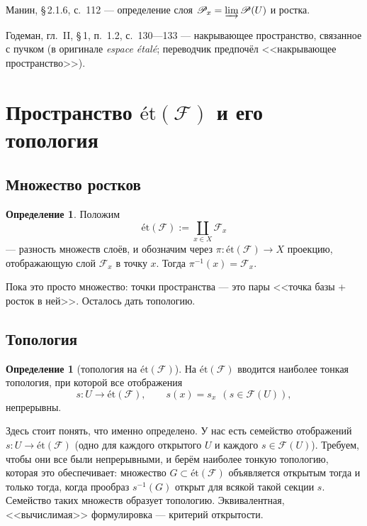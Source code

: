 \documentclass[11pt,b5paper]{article}
\newcommand{\et}{\text{ét}}
\newcommand{\Shv}[1]{\mathscr{#1}}   %
\newcommand{\dirlim}{\varinjlim}
\theoremstyle{plain}
\theoremstyle{definition}
\newtheorem{defninner}[thminner]{Определение}
\theoremstyle{remark}
\newcommand{\thmbeg}{%
  \par\smallskip
  \begin{lrbox}{\thmbox}%
  \begin{minipage}{\linewidth}}
\newcommand{\thmend}{%
  \end{minipage}%
  \end{lrbox}%
  \noindent\usebox{\thmbox}%
  \par\smallskip}
\newenvironment{defn}{\thmbeg\begin{defninner}}{\end{defninner}\thmend}
\newenvironment{bookbox}{\par\smallskip\begingroup\color{gray}\noindent
  \ignorespaces}{\par\endgroup\smallskip}
\newcommand{\booksrc}[1]{%
  \noindent{\bfseries\small Дополнение из книги:}\par\smallskip
  \noindent#1\par\smallskip}
\let\brutsection\section
\renewcommand{\section}{\Needspace{7\baselineskip}\brutsection}
\let\brutsubsection\subsection
\renewcommand{\subsection}{\Needspace{5\baselineskip}\brutsubsection}
\begin{document}
\begin{bookbox}
\booksrc{Манин, \S\,2.1.6, с.~112 --- определение слоя
 $\Shv{P}_x=\dirlim \Shv{P}(U)$ и ростка.
\par\smallskip
 Годеман, гл.~II, \S\,1, п.~1.2, с.~130---133 --- накрывающее
 пространство, связанное с пучком (в оригинале \emph{espace étalé};
 переводчик предпочёл <<накрывающее пространство>>).
}
\end{bookbox}

\section[Пространство ét(F) и его топология]
 {Пространство $\et(\Shv{F})$ и его топология}

\subsection{Множество ростков}
\leavevmode\par
\begin{defn}
Положим
\begin{equation}\label{eq:etale-set}
 \et(\Shv{F}):=\coprod_{x\in X}\Shv{F}_x
\end{equation}
--- разность множеств слоёв, и обозначим через
$\pi\colon\et(\Shv{F})\to X$ проекцию, отображающую слой $\Shv{F}_x$
в точку $x$. Тогда $\pi^{-1}(x)=\Shv{F}_x$.
\end{defn}

Пока это просто множество: точки пространства --- это пары
<<точка базы + росток в ней>>. Осталось дать топологию.

\subsection{Топология}
\leavevmode\par
\begin{defn}[топология на $\et(\Shv{F})$]
На $\et(\Shv{F})$ вводится наиболее тонкая топология, при которой все
отображения
\[
 s\colon U\longrightarrow\et(\Shv{F}),\qquad
 s(x)=s_x\ \ (s\in\Shv{F}(U)),
\]
непрерывны.
\end{defn}

Здесь стоит понять, что именно определено. У нас есть семейство
отображений $s\colon U\to\et(\Shv{F})$ (одно для каждого открытого $U$
и каждого $s\in\Shv{F}(U)$). Требуем, чтобы они все были непрерывными,
и берём наиболее тонкую топологию, которая это обеспечивает: множество
$G\subset\et(\Shv{F})$ объявляется открытым тогда и только тогда, когда
прообраз $s^{-1}(G)$ открыт для всякой такой секции $s$. Семейство таких
множеств образует топологию. Эквивалентная, <<вычислимая>> формулировка
--- критерий открытости.
\end{document}
